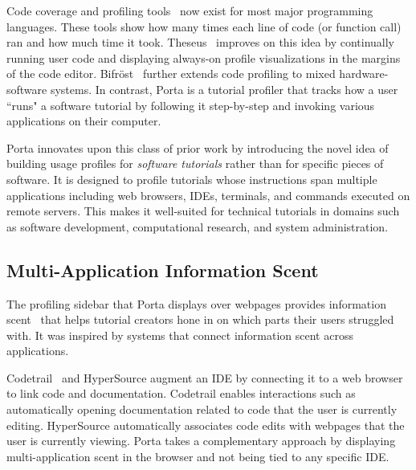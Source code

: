 Code coverage and profiling tools~\cite{Graham1982,Srivastava1994} now exist for most
major programming languages. These tools show how many times each line of
code (or function call) ran and how much time it took. Theseus~\cite{Lieber2014} improves on
this idea by continually running user code and displaying
always-on profile visualizations in the margins of the code
editor. Bifr\"{o}st~\cite{McGrath2017} further extends code profiling to
mixed hardware-software systems. In contrast, Porta is a
tutorial profiler that tracks how a user ``runs" a software tutorial by
following it step-by-step and invoking various applications on
their computer.


%

Porta innovates upon this class of prior work by introducing the novel
idea of building usage profiles for \emph{software tutorials} rather
than for specific pieces of software. It is designed to profile
tutorials whose instructions span multiple applications including web
browsers, IDEs, terminals, and commands executed on remote servers.
This makes it well-suited for technical tutorials in domains such as
software development, computational research, and system
administration.


\subsection{Multi-Application Information Scent}

The profiling sidebar that Porta displays over webpages provides
information scent~\cite{Pirolli2007} that helps tutorial creators hone in on
which parts their users struggled with. It was inspired by systems
that connect information scent across applications.

Codetrail~\cite{Goldman2009} and HyperSource \cite{Hartmann2011} augment
an IDE by connecting it to a web browser to link code and documentation.
Codetrail enables interactions such as automatically opening
documentation related to code that the user is currently editing.
HyperSource automatically associates code edits with webpages that the
user is currently viewing. Porta takes a complementary approach by
displaying multi-application scent in the browser and not being tied to
any specific IDE.

